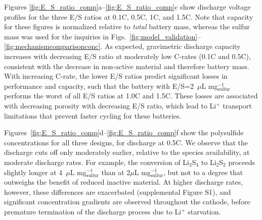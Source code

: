 \documentclass{elsarticle}
\begin{document}

Figures \ref{fig:E_S_ratio_comp}a--\ref{fig:E_S_ratio_comp}c show discharge voltage profiles for the three E/S ratios at 0.1C, 0.5C, 1C, and 1.5C. Note that capacity for these figures is normalized relative to \textit{total} battery mass, whereas the sulfur mass was used for the inquiries in Figs.~\ref{fig:model_validation}--\ref{fig:mechanismcomparisonconc}. As expected, gravimetric discharge capacity increases with decreasing E/S ratio at moderately low C-rates (0.1C and 0.5C), consistent with the decrease in non-active material and therefore battery mass. With increasing C-rate, the lower E/S ratios predict significant losses in performance and capacity, such that the battery with E/S=2~$\mu$L mg$^{-1}_\mathrm{sulfur}$ performs the worst of all E/S ratios at 1.0C and 1.5C. These losses are associated with decreasing porosity with decreasing E/S ratio, which lead to Li$^+$ transport limitations that prevent faster cycling for these batteries.

Figures~\ref{fig:E_S_ratio_comp}d--\ref{fig:E_S_ratio_comp}f show the polysulfide concentrations for all three designs, for discharge at 0.5C.  We observe that the discharge cuts off only moderately earlier, relative to the species availability, at moderate discharge rates. For example, the conversion of Li$_2$S$_4$ to Li$_2$S$_2$ proceeds slightly longer at 4~$\mu$L mg$^{-1}_\mathrm{sulfur}$ than at 2$\mu$L mg$^{-1}_\mathrm{sulfur}$, but not to a degree that outweighs the benefit of reduced inactive material. At higher discharge rates, however, these differences are exacerbated (supplemental Figure S1), and significant concentration gradients are observed throughout the cathode, before premature termination of the discharge process due to Li$^+$ starvation.  
\end{document}
